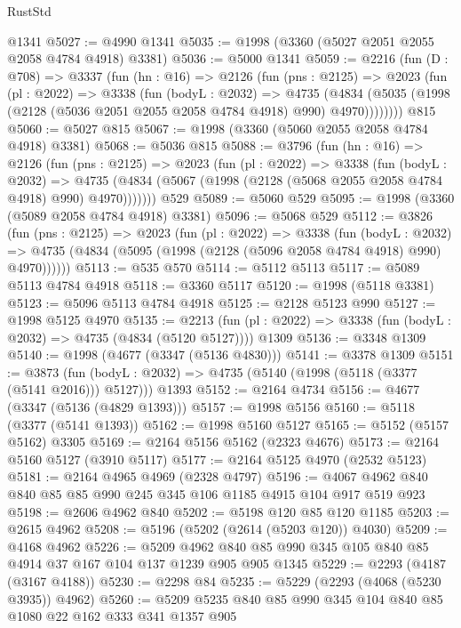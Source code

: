 \begin{lexlean}{RustStd}
\begin{coremodule}
    @1341
@5027 := @4990 @1341
@5035 := @1998 (@3360 (@5027 @2051 @2055 @2058 @4784 @4918) @3381)
@5036 := @5000 @1341
@5059 := @2216
    (fun (D : @708) =>
    @3337
      (fun (hn : @16) =>
      @2126
        (fun (pns : @2125) =>
        @2023
          (fun (pl : @2022) =>
          @3338
            (fun (bodyL : @2032) =>
            @4735
              (@4834 (@5035 (@1998 (@2128 (@5036 @2051 @2055 @2058 @4784 @4918) @990) @4970))))))))
    @815
@5060 := @5027 @815
@5067 := @1998 (@3360 (@5060 @2055 @2058 @4784 @4918) @3381)
@5068 := @5036 @815
@5088 := @3796
    (fun (hn : @16) =>
    @2126
      (fun (pns : @2125) =>
      @2023
        (fun (pl : @2022) =>
        @3338
          (fun (bodyL : @2032) =>
          @4735 (@4834 (@5067 (@1998 (@2128 (@5068 @2055 @2058 @4784 @4918) @990) @4970)))))))
    @529
@5089 := @5060 @529
@5095 := @1998 (@3360 (@5089 @2058 @4784 @4918) @3381)
@5096 := @5068 @529
@5112 := @3826
    (fun (pns : @2125) =>
    @2023
      (fun (pl : @2022) =>
      @3338
        (fun (bodyL : @2032) =>
        @4735 (@4834 (@5095 (@1998 (@2128 (@5096 @2058 @4784 @4918) @990) @4970))))))
@5113 := @535 @570
@5114 := @5112 @5113
@5117 := @5089 @5113 @4784 @4918
@5118 := @3360 @5117
@5120 := @1998 (@5118 @3381)
@5123 := @5096 @5113 @4784 @4918
@5125 := @2128 @5123 @990
@5127 := @1998 @5125 @4970
@5135 := @2213
    (fun (pl : @2022) => @3338 (fun (bodyL : @2032) => @4735 (@4834 (@5120 @5127))))
    @1309
@5136 := @3348 @1309
@5140 := @1998 (@4677 (@3347 (@5136 @4830)))
@5141 := @3378 @1309
@5151 := @3873
    (fun (bodyL : @2032) => @4735 (@5140 (@1998 (@5118 (@3377 (@5141 @2016))) @5127)))
    @1393
@5152 := @2164 @4734
@5156 := @4677 (@3347 (@5136 (@4829 @1393)))
@5157 := @1998 @5156
@5160 := @5118 (@3377 (@5141 @1393))
@5162 := @1998 @5160 @5127
@5165 := @5152 (@5157 @5162) @3305
@5169 := @2164 @5156 @5162 (@2323 @4676)
@5173 := @2164 @5160 @5127 (@3910 @5117)
@5177 := @2164 @5125 @4970 (@2532 @5123)
@5181 := @2164 @4965 @4969 (@2328 @4797)
@5196 := @4067 @4962 @840 @840 @85 @85 @990 @245 @345 @106 @1185 @4915 @104 @917 @519 @923
@5198 := @2606 @4962 @840
@5202 := @5198 @120 @85 @120 @1185
@5203 := @2615 @4962
@5208 := @5196 (@5202 (@2614 (@5203 @120)) @4030)
@5209 := @4168 @4962
@5226 := @5209 @4962 @840 @85 @990 @345 @105 @840 @85 @4914 @37 @167 @104 @137 @1239 @905 @905 @1345
@5229 := @2293 (@4187 (@3167 @4188))
@5230 := @2298 @84
@5235 := @5229 (@2293 (@4068 (@5230 @3935)) @4962)
@5260 := @5209
    @5235
    @840
    @85
    @990
    @345
    @104
    @840
    @85
    @1080
    @22
    @162
    @333
    @341
    @1357
    @905

\end{coremodule}
\end{lexlean}
